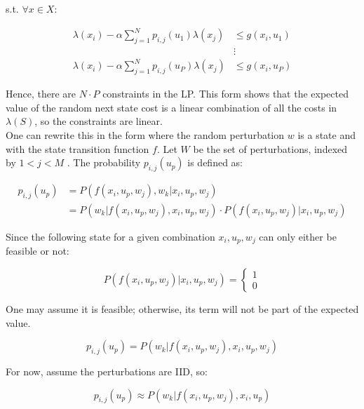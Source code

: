 \documentclass{article}
\begin{document}
	s.t. $\forall x \in X$:
	
	\begin{align*}
	\lambda(x_{i})-\alpha\sum_{j=1}^{N}p_{i,j}(u_{1})\lambda(x_{j}) &\leq g(x_{i},u_{1}) \\
	&\vdots\\
	\lambda(x_{i})-\alpha\sum_{j=1}^{N}p_{i,j}(u_{P})\lambda(x_{j}) &\leq g(x_{i},u_{P})
	\end{align*}
	
	Hence, there are $N\cdot P$ constraints in the LP. This form shows that the expected value of the random next state cost is a linear combination of all the costs in $\lambda(S)$, so the constraints are linear.\\
	
	One can rewrite this in the form where the random perturbation $w$ is a state and with the state transition function $f$. Let $W$ be the set of perturbations, indexed by $1<j<M$ . The probability $p_{i,j}(u_{p})$ is defined as:
	
	\begin{align*} 
	p_{i,j}(u_{p})&= P(f(x_{i},u_{p},w_{j}),w_{k} | x_{i},u_{p},w_{j}) \\ 
	&= P(w_{k} | f(x_{i},u_{p},w_{j}),x_{i},u_{p},w_{j})\cdot P(f(x_{i},u_{p},w_{j})| x_{i},u_{p},w_{j})
	\end{align*}
	
	Since the following state for a given combination $x_{i},u_{p},w_{j}$ can only either be feasible or not:
	
	\begin{displaymath}
	P(f(x_{i},u_{p},w_{j})| x_{i},u_{p},w_{j}) = 
	\left\{
	\begin{array}{l}
	1\\
	0
	\end{array}
	\right.
	\end{displaymath}
	
	One may assume it is feasible; otherwise, its term will not be part of the expected value.
	
	\begin{displaymath} 
	p_{i,j}(u_{p})=P(w_{k} | f(x_{i},u_{p},w_{j}),x_{i},u_{p},w_{j})
	\end{displaymath}
	
	For now, assume the perturbations are IID, so:
	
	\begin{displaymath} 
	p_{i,j}(u_{p})\approx P(w_{k} | f(x_{i},u_{p},w_{j}),x_{i},u_{p})
	\end{displaymath}\\
	
\end{document}
